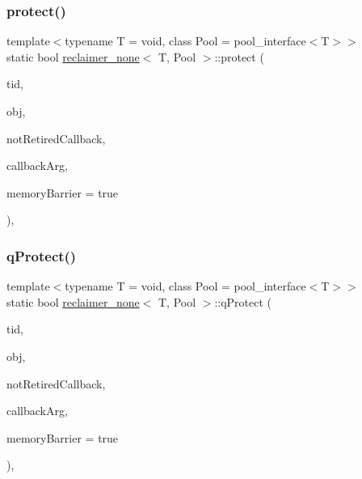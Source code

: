 \subsubsection{\texorpdfstring{protect()}{protect()}}
{\footnotesize\ttfamily template$<$typename T  = void, class Pool  = pool\+\_\+interface$<$\+T$>$$>$ \\
static bool \hyperlink{classreclaimer__none}{reclaimer\+\_\+none}$<$ T, Pool $>$\+::protect (\begin{DoxyParamCaption}\item[{const int}]{tid,  }\item[{T $\ast$const}]{obj,  }\item[{\hyperlink{globals_8h_a57f5c0d40b156d7d996492fb2f16e3cd}{Callback\+Type}}]{not\+Retired\+Callback,  }\item[{\hyperlink{globals_8h_a3de64ef48066ac6430631c8b81a15345}{Callback\+Arg}}]{callback\+Arg,  }\item[{bool}]{memory\+Barrier = {\ttfamily true} }\end{DoxyParamCaption})\hspace{0.3cm}{\ttfamily [inline]}, {\ttfamily [static]}}

\mbox{\label{classreclaimer__none_afbc218123a9eef8bb282e77cf3b594c2}} 
\subsubsection{\texorpdfstring{q\+Protect()}{qProtect()}}
{\footnotesize\ttfamily template$<$typename T  = void, class Pool  = pool\+\_\+interface$<$\+T$>$$>$ \\
static bool \hyperlink{classreclaimer__none}{reclaimer\+\_\+none}$<$ T, Pool $>$\+::q\+Protect (\begin{DoxyParamCaption}\item[{const int}]{tid,  }\item[{T $\ast$const}]{obj,  }\item[{\hyperlink{globals_8h_a57f5c0d40b156d7d996492fb2f16e3cd}{Callback\+Type}}]{not\+Retired\+Callback,  }\item[{\hyperlink{globals_8h_a3de64ef48066ac6430631c8b81a15345}{Callback\+Arg}}]{callback\+Arg,  }\item[{bool}]{memory\+Barrier = {\ttfamily true} }\end{DoxyParamCaption})\hspace{0.3cm}{\ttfamily [inline]}, {\ttfamily [static]}}

